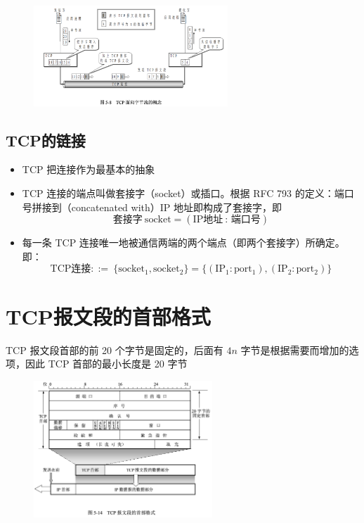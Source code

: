 \documentclass[cs4size,a4paper,10pt]{ctexart}
\begin{document}
	\begin{figure}[H]
		\centering
		\includegraphics[width=0.65\textwidth]{img/5.8}
	\end{figure}

	\subsection{TCP的链接}
	\begin{itemize}
		\item TCP 把连接作为最基本的抽象
		\item TCP 连接的端点叫做套接字（socket）或插口。根据 RFC 793 的定义：端口号拼接到（concatenated with）IP 地址即构成了套接字，即
		$$\mbox{套接字}\  \mathrm{socket} =(\mathrm{IP} \mbox{地址}\ \mbox{:\ 端口号})$$
		\item 每一条 TCP 连接唯一地被通信两端的两个端点（即两个套接字）所确定。即：
		$$\mathrm{TCP} \mbox{连接} ::= \ \{\mathrm{socket_1,socket_2}\} = \{\mathrm{(IP_1:port_1),(IP_2:port_2)}\}$$
	\end{itemize}

	\section{TCP报文段的首部格式}
	TCP 报文段首部的前 20 个字节是固定的，后面有 $4n$ 字节是根据需要而增加的选项，因此 TCP 首部的最小长度是 20 字节
	\begin{figure}[H]
		\centering
		\includegraphics[width=0.6\textwidth]{img/5.14}
	\end{figure}
\end{document}
